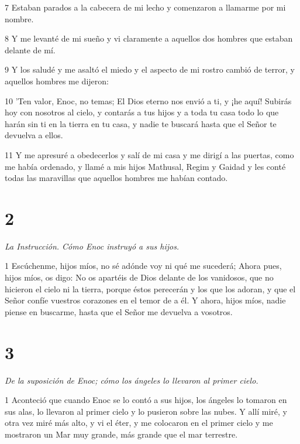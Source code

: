 \par 7 Estaban parados a la cabecera de mi lecho y comenzaron a llamarme por mi nombre.

\par 8 Y me levanté de mi sueño y vi claramente a aquellos dos hombres que estaban delante de mí.

\par 9 Y los saludé y me asaltó el miedo y el aspecto de mi rostro cambió de terror, y aquellos hombres me dijeron:

\par 10 'Ten valor, Enoc, no temas; El Dios eterno nos envió a ti, y ¡he aquí! Subirás hoy con nosotros al cielo, y contarás a tus hijos y a toda tu casa todo lo que harán sin ti en la tierra en tu casa, y nadie te buscará hasta que el Señor te devuelva a ellos.

\par 11 Y me apresuré a obedecerlos y salí de mi casa y me dirigí a las puertas, como me había ordenado, y llamé a mis hijos Mathusal, Regim y Gaidad y les conté todas las maravillas que aquellos hombres me habían contado.

\chapter{2}

\par \textit{La Instrucción. Cómo Enoc instruyó a sus hijos.}

\par 1 Escúchenme, hijos míos, no sé adónde voy ni qué me sucederá; Ahora pues, hijos míos, os digo: No os apartéis de Dios delante de los vanidosos, que no hicieron el cielo ni la tierra, porque éstos perecerán y los que los adoran, y que el Señor confíe vuestros corazones en el temor de a él. Y ahora, hijos míos, nadie piense en buscarme, hasta que el Señor me devuelva a vosotros.

\chapter{3}

\par \textit{De la suposición de Enoc; cómo los ángeles lo llevaron al primer cielo.}

\par 1 Aconteció que cuando Enoc se lo contó a sus hijos, los ángeles lo tomaron en sus alas, lo llevaron al primer cielo y lo pusieron sobre las nubes. Y allí miré, y otra vez miré más alto, y vi el éter, y me colocaron en el primer cielo y me mostraron un Mar muy grande, más grande que el mar terrestre.

